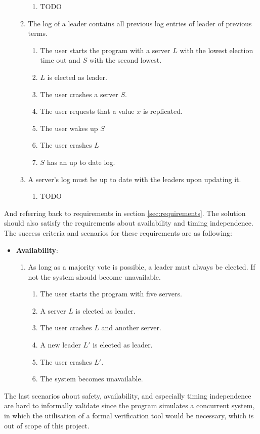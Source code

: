 \begin{itemize}
\begin{enumerate}
\begin{enumerate}
        \item TODO
        \end{enumerate}
    \item The log of a leader contains all previous log entries of leader of previous terms.
        \begin{enumerate}
        \item The user starts the program with a server $L$ with the lowest election time out and $S$ with the second lowest.
        \item $L$ is elected as leader.
        \item The user crashes a server $S$.
        \item The user requests that a value $x$ is replicated.
        \item The user wakes up $S$
        \item The user crashes $L$
        \item $S$ has an up to date log.
        \end{enumerate}
    \item A server's log must be up to date with the leaders upon updating it.
        \begin{enumerate}
        \item TODO
        \end{enumerate}
    \end{enumerate}
\end{itemize}
And referring back to requirements in section \ref{sec:requirements}. The solution should also satisfy the requirements about availability and timing independence. The success criteria and scenarios for these requirements are as following:
\begin{itemize}
\item \textbf{Availability}:
    \begin{enumerate}
    \item As long as a majority vote is possible, a leader must always be elected. If not the system should become unavailable.
        \begin{enumerate}
        \item The user starts the program with five servers.
        \item A server $L$ is elected as leader.
        \item The user crashes $L$ and another server.
        \item A new leader $L'$ is elected as leader.
        \item The user crashes $L'$.
        \item The system becomes unavailable.
        \end{enumerate}
    \end{enumerate}
\end{itemize}
The last scenarios about safety, availability, and especially timing independence are hard to informally validate since the program simulates a concurrent system, in which the utilisation of a formal verification tool would be necessary, which is out of scope of this project. %

